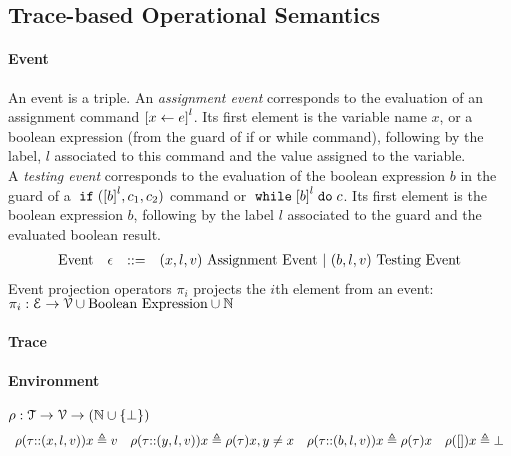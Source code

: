 \subsection{{Trace-based Operational Semantics}}
\label{sec:operational_semantics}
\paragraph*{Event}
An event is a triple.
An \emph{assignment event} corresponds to the evaluation of an assignment command $\clabel{\assign{x}{\expr}}^l$.
Its first element is the variable name $x$,
or a boolean expression (from the guard of if or while command), 
following by 
 the label, $l$ associated to this command and the value assigned to the variable.
 \\
 A \emph{testing event} corresponds to the evaluation of the boolean expression $b$ in the guard of a $\eif(\clabel{b}^l, c_1, c_2)$ command or $\ewhile \clabel{b}^l \edo c$.
 Its first element is the boolean expression $b$, following by 
 the label $l$ associated to the guard and the evaluated boolean result.
%
\[
\begin{array}{llll}
  \mbox{Event} 
  & \mathtt{\epsilon} & ::= & 
  ({x}, l, v) ~ \mbox{Assignment Event} 
  ~|~(b, l, v) ~ \mbox{Testing Event}
\end{array}
\]
Event projection operators $\pi_i$ projects the $i$th element from an event: 
\\
$\pi_i : 
\mathcal{E} \to \mathcal{V}\cup \mbox{Boolean Expression}  \cup \mathbb{N} $
\paragraph*{Trace}

%
\paragraph{Environment} $ \rho : {\mathcal{T}}  \to \mathcal{V} \to( \mathbb{N} \cup \{\bot\})$
\[
\begin{array}{llll}
\rho(\mathtt{\tau}  {\small ::} (x, l, v)) x \triangleq v
&
\rho(\mathtt{\tau} {\small ::} (y, l, v)) x \triangleq \rho(\mathtt{\tau}) x, y \neq x
&
\rho(\mathtt{\tau} {\small ::} (b, l, v)) x \triangleq \rho(\mathtt{\tau}) x
&
\rho({[]} ) x \triangleq \bot
\end{array}
\]
